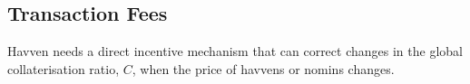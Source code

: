 









\newpage
\subsection{Transaction Fees} Havven needs a direct incentive mechanism that can correct changes in the global collaterisation ratio, $C$, when the price of havvens or nomins changes. \\

